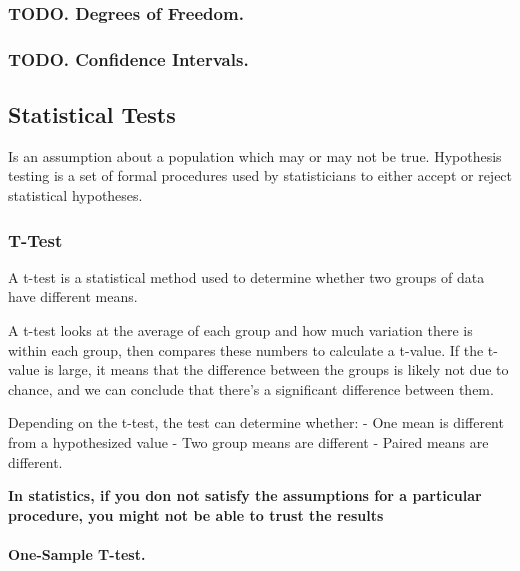 \documentclass[11pt]{article}
\begin{document}
\hypertarget{todo.-degrees-of-freedom.}{%
\subsubsection{TODO. Degrees of
Freedom.}\label{todo.-degrees-of-freedom.}}

\hypertarget{todo.-confidence-intervals.}{%
\subsubsection{TODO. Confidence
Intervals.}\label{todo.-confidence-intervals.}}

    \hypertarget{statistical-tests}{%
\subsection{Statistical Tests}\label{statistical-tests}}

Is an assumption about a population which may or may not be true.
Hypothesis testing is a set of formal procedures used by statisticians
to either accept or reject statistical hypotheses.

\hypertarget{t-test}{%
\subsubsection{T-Test}\label{t-test}}

A t-test is a statistical method used to determine whether two groups of
data have different means.

A t-test looks at the average of each group and how much variation there
is within each group, then compares these numbers to calculate a
t-value. If the t-value is large, it means that the difference between
the groups is likely not due to chance, and we can conclude that there's
a significant difference between them.

Depending on the t-test, the test can determine whether: - One mean is
different from a hypothesized value - Two group means are different -
Paired means are different.

\textbf{In statistics, if you don not satisfy the assumptions for a
particular procedure, you might not be able to trust the results}

\hypertarget{one-sample-t-test.}{%
\paragraph{One-Sample T-test.}\label{one-sample-t-test.}}
\end{document}
